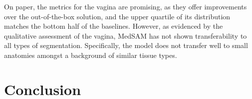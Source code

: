 \documentclass[11pt,twoside]{report}
\begin{document}
On paper, the metrics for the vagina are promising, as they offer improvements over the out-of-the-box solution, and the upper quartile of its distribution matches the bottom half of the baselines. However, as evidenced by the qualitative assessment of the vagina, MedSAM has not shown transferability to all types of segmentation. Specifically, the model does not transfer well to small anatomies amongst a background of similar tissue types.

\chapter{Conclusion}\label{sect:conclusion}

\end{document}
